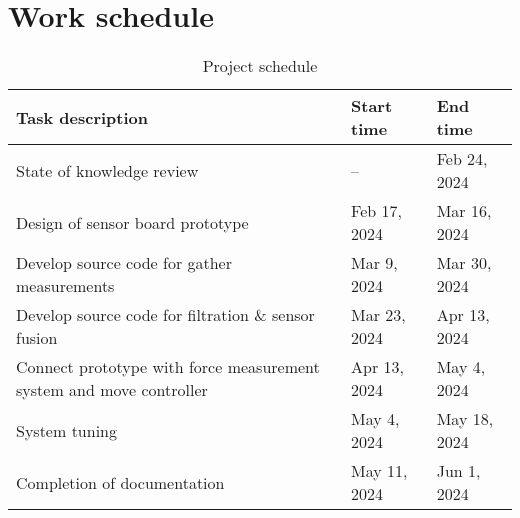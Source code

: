 \section{Work schedule}

\renewcommand{\arraystretch}{1.5}
\begin{table}[!h]
\centering
\begin{tabular}{|m{}|m{}|m{}|} 
\hline
\rowcolor{Gray}
Task description & Start time & End time  \\
\hline
State of knowledge review & -- & Feb 24, 2024 \\
\hline
Design of sensor board prototype & Feb 17, 2024 & Mar 16, 2024 \\
\hline
Develop source code for gather measurements & Mar 9, 2024 & Mar 30, 2024 \\
\hline
Develop source code for filtration \& sensor fusion & Mar 23, 2024 & Apr 13, 2024 \\
\hline
Connect prototype with force measurement system and move controller & Apr 13, 2024 & May 4, 2024 \\
\hline
System tuning & May 4, 2024 & May 18, 2024 \\
\hline
Completion of documentation  & May 11, 2024 & Jun 1, 2024 \\
\hline
\end{tabular}
\caption{Project schedule}
\label{work_schedule}
\end{table}

